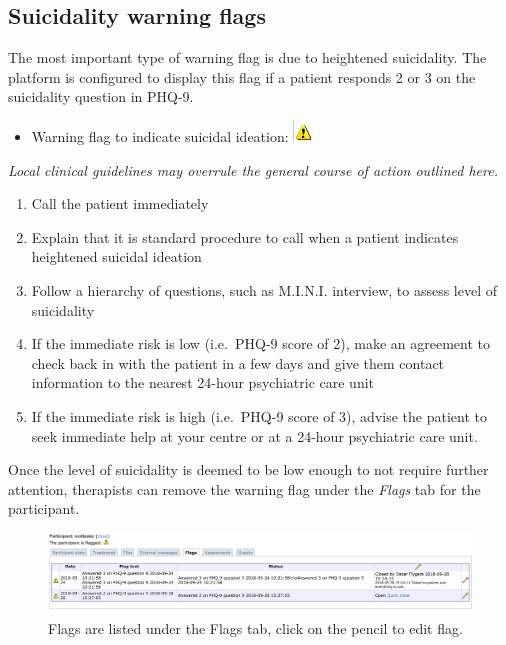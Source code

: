 \documentclass[]{book}
\providecommand{\tightlist}{%
  \setlength{\itemsep}{0pt}\setlength{\parskip}{0pt}}
\theoremstyle{definition}
\theoremstyle{definition}
\theoremstyle{definition}
\theoremstyle{remark}
\begin{document}
\hypertarget{suicidality-warning-flags}{%
\subsection{Suicidality warning flags}\label{suicidality-warning-flags}}

The most important type of warning flag is due to heightened
suicidality. The platform is configured to display this flag if a
patient responds 2 or 3 on the suicidality question in PHQ-9.

\begin{itemize}
\tightlist
\item
  Warning flag to indicate suicidal ideation:
  \includegraphics{images/suicidality-warning.png}
\end{itemize}

\emph{Local clinical guidelines may overrule the general course of
action outlined here.}

\begin{enumerate}
\def\labelenumi{\arabic{enumi}.}
\tightlist
\item
  Call the patient immediately
\item
  Explain that it is standard procedure to call when a patient indicates
  heightened suicidal ideation
\item
  Follow a hierarchy of questions, such as M.I.N.I. interview, to assess
  level of suicidality
\item
  If the immediate risk is low (i.e.~PHQ-9 score of 2), make an
  agreement to check back in with the patient in a few days and give
  them contact information to the nearest 24-hour psychiatric care unit
\item
  If the immediate risk is high (i.e.~PHQ-9 score of 3), advise the
  patient to seek immediate help at your centre or at a 24-hour
  psychiatric care unit.
\end{enumerate}

Once the level of suicidality is deemed to be low enough to not require
further attention, therapists can remove the warning flag under the
\emph{Flags} tab for the participant.

\begin{figure}
\centering
\includegraphics{images/flags-tab.png}
\caption{Flags are listed under the Flags tab, click on the pencil to
edit flag.}
\end{figure}
\end{document}
